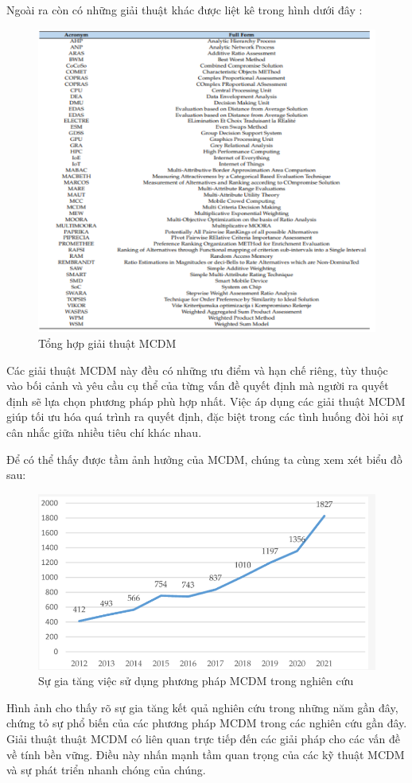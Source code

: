 Ngoài ra còn có những giải thuật khác được liệt kê trong hình dưới đây : 

\begin{figure}[H]
    \centering
    \includegraphics[width=0.8\linewidth,height=0.3\textheight]{images/MCDMalgorithm.png}
    \vspace{0.6cm}
    \caption{Tổng hợp giải thuật MCDM \cite{pijush}}
\end{figure}

Các giải thuật MCDM này đều có những ưu điểm và hạn chế riêng, tùy thuộc vào bối cảnh và yêu cầu cụ thể của từng vấn đề quyết định mà người ra quyết định sẽ lựa chọn phương pháp phù hợp nhất. Việc áp dụng các giải thuật MCDM giúp tối ưu hóa quá trình ra quyết định, đặc biệt trong các tình huống đòi hỏi sự cân nhắc giữa nhiều tiêu chí khác nhau. 

Để có thể thấy được tầm ảnh hưởng của MCDM, chúng ta cùng xem xét biểu đồ sau: 
\begin{figure}[H]
    \centering
    \includegraphics[width=0.5\linewidth]{images/MCDMgraph.png}
    \vspace{0.6cm}
    \caption{Sự gia tăng việc sử dụng phương pháp MCDM trong nghiên cứu}
\end{figure}

Hình ảnh cho thấy rõ sự gia tăng kết quả nghiên cứu trong những năm gần đây, chứng tỏ sự phổ biến của các phương pháp MCDM trong các nghiên cứu gần đây. Giải thuật thuật MCDM có liên quan trực tiếp đến các giải pháp cho các vấn đề về tính bền vững. Điều này nhấn mạnh tầm quan trọng của các kỹ thuật MCDM và sự phát triển nhanh chóng của chúng. 


